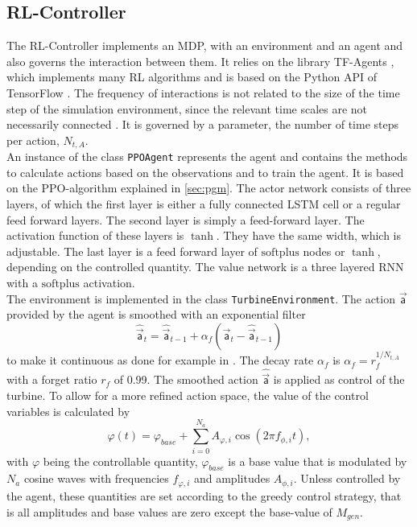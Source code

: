 \subsection{RL-Controller}
The RL-Controller implements an MDP, with an environment and an agent and also governs the interaction between them. It relies on the library TF-Agents \cite{guadarrama_tf-agents_2018}, which implements many RL algorithms and is based on the Python API of TensorFlow \cite{abadi_tensorflow_2015}. The frequency of interactions is not related to the size of the time step of the simulation environment, since the relevant time scales are not necessarily connected \cite{rabault_deep_2018}. It is governed by a parameter, the number of time steps per action, $N_{t,A}$. \\
An instance of the class \texttt{PPOAgent} represents the agent and contains the methods to calculate actions based on the observations and to train the agent. It is based on the PPO-algorithm explained in \ref{sec:pgm}. The actor network consists of three layers, of which the first layer is either a fully connected LSTM cell or a regular feed forward layers. The second layer is simply a feed-forward layer. The activation function of these layers is $\tanh$. They have the same width, which is adjustable. The last layer is a feed forward layer of $\mathrm{softplus}$ nodes or $\tanh$, depending on the controlled quantity. The value network is a three layered RNN with a $\mathrm{softplus}$ activation. \\
The environment is implemented in the class \texttt{TurbineEnvironment}. The action $\vec{\mathsf{a}}$ provided by the agent is smoothed with an exponential filter
\begin{equation}
\hat{\mathsf{\vec{a}}}_t = \hat{\mathsf{\vec{a}}}_{t-1} + \alpha_f(\mathsf{\vec{a}}_t - \hat{\mathsf{\vec{a}}}_{t-1}) \label{eq:exp_filter}
\end{equation}
to make it continuous as done for example in \cite{rabault_deep_2018}. The decay rate $\alpha_f$ is $\alpha_f = r_f^{1/N_{t,A}}$ with a forget ratio $r_f$ of \SI{0.99}{}. The smoothed action $\hat{\mathsf{\vec{a}}}$ is applied as control of the turbine. To allow for a more refined action space, the value of the control variables is calculated by
\begin{equation}
\varphi(t) = \varphi_{base} + \sum^{N_a}_{i=0} A_{\varphi, i} \cos(2 \pi f_{\phi,i}t), \label{control_amplitude}
\end{equation}
with $\varphi$ being the controllable quantity, $\varphi_{base}$ is a base value that is modulated by $N_a$ cosine waves with frequencies $f_{\varphi,i}$ and amplitudes $A_{\phi,i}$. Unless controlled by the agent, these quantities are set according to the greedy control strategy, that is all amplitudes and base values are zero except the base-value of $M_{gen}$. \\
